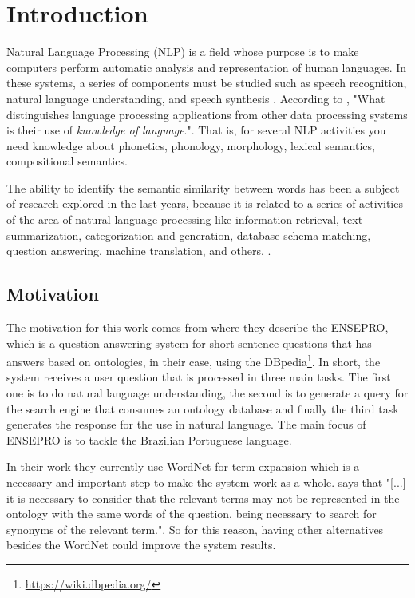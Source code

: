 \section{Introduction}\label{chap:intro}



Natural Language Processing (NLP) is a field whose purpose is to make computers perform automatic analysis and representation of human languages. In these systems, a series of components must be studied such as speech recognition, natural language understanding, and speech synthesis \cite{DBLP:journals/corr/abs-1708-02709}.
According to , "What distinguishes language processing applications from other data processing systems is their use of \textit{knowledge of language}.". That is, for several NLP activities you need knowledge about phonetics, phonology, morphology, lexical semantics, compositional semantics.

The ability to identify the semantic similarity between words has been a subject of research explored in the last years, because it is related to a series of activities of the area of natural language processing like information retrieval, text summarization, categorization and generation, database schema matching, question answering, machine translation, and others. \cite{Pawar2018CalculatingTS, gonccalo2018distributional, SRAVANTHI2017SemanticSB, Islam2007ApplicationsOC}. 

\subsection{Motivation} 

The motivation for this work comes from  where they describe the ENSEPRO, which is a question answering system for short sentence questions that has answers based on ontologies, in their case, using the DBpedia\footnote{\url{https://wiki.dbpedia.org/}}. In short, the system receives a user question that is processed in three main tasks. The first one is to do natural language understanding, the second is to generate a query for the search engine that consumes an ontology database and finally the third task generates the response for the use in natural language. The main focus of ENSEPRO is to tackle the Brazilian Portuguese language. 

In their work they currently use WordNet for term expansion which is a necessary and important step to make the system work as a whole.  says that 
"[...] it is necessary to consider that the relevant terms may not be represented in the ontology with the same words of the question, being necessary to search for synonyms of the relevant term.". 
So for this reason, having other alternatives besides the WordNet could improve the system results.

